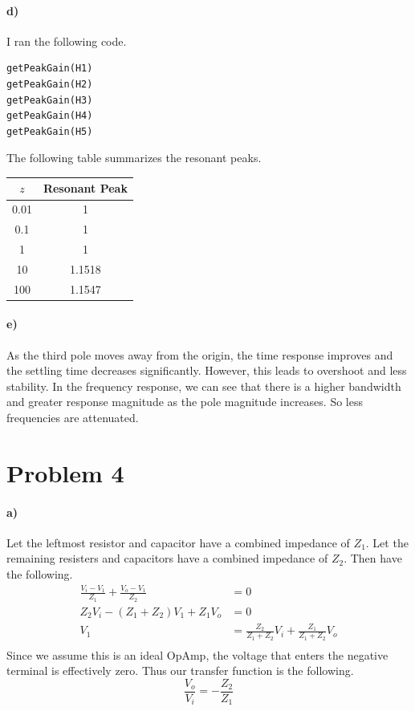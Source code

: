 \documentclass[12pt]{article}
\begin{document}
\paragraph{d)}

I ran the following code.
\begin{verbatim}
getPeakGain(H1)
getPeakGain(H2)
getPeakGain(H3)
getPeakGain(H4)
getPeakGain(H5)
\end{verbatim}
The following table summarizes the resonant peaks.
\begin{center}
    \begin{tabular}{c|c}
        \(z\) & Resonant Peak\\
        \hline
        0.01 & 1\\
        0.1 & 1\\
        1 & 1\\
        10 & 1.1518\\
        100 & 1.1547
    \end{tabular}
\end{center}

\paragraph{e)}

As the third pole moves away from the origin, the time response improves and the settling time decreases significantly.
However, this leads to overshoot and less stability. In the frequency response, we can see that there is a higher
bandwidth and greater response magnitude as the pole magnitude increases. So less frequencies are attenuated.

\section*{Problem 4}

\paragraph{a)}

Let the leftmost resistor and capacitor have a combined impedance of \(Z_1\). Let
the remaining resisters and capacitors have a combined impedance of \(Z_2\). Then have the following.
\begin{align*}
    \frac{V_i-V_1}{Z_1}+\frac{V_o-V_1}{Z_2}&=0\\
    Z_2V_i-(Z_1+Z_2)V_1+Z_1V_o&=0\\
    V_1&=\frac{Z_2}{Z_1+Z_2}V_i + \frac{Z_1}{Z_1+Z_2}V_o\\
\end{align*}
Since we assume this is an ideal OpAmp, the voltage that enters the negative terminal is effectively zero.
Thus our transfer function is the following.
\[\frac{V_o}{V_i}=-\frac{Z_2}{Z_1}\]
\end{document}
